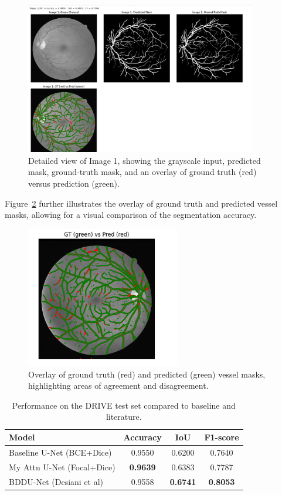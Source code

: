 \documentclass[11pt]{article}
\begin{document}
\begin{figure}[h!]
    \centering
    \includegraphics[width=0.9\textwidth]{figure_image_1_metrics_and_masks.png}
    \caption{Detailed view of Image 1, showing the grayscale input, predicted mask, ground-truth mask, and an overlay of ground truth (red) versus prediction (green).}
    \label{fig:image_1_metrics_and_masks}
\end{figure}

Figure~\ref{fig:gt_vs_pred_overlay} further illustrates the overlay of ground truth and predicted vessel masks, allowing for a visual comparison of the segmentation accuracy.

\begin{figure}[h!]
    \centering
    \includegraphics[width=0.6\textwidth]{figure_gt_vs_pred_overlay.png}
    \caption{Overlay of ground truth (red) and predicted (green) vessel masks, highlighting areas of agreement and disagreement.}
    \label{fig:gt_vs_pred_overlay}
\end{figure}


\begin{table}[h]
\centering
\caption{Performance on the DRIVE test set compared to baseline and literature.}
\begin{tabular}{lccc}
\hline
\textbf{Model} & \textbf{Accuracy} & \textbf{IoU} & \textbf{F1-score} \\
\hline
Baseline U-Net (BCE+Dice) & 0.9550 & 0.6200 & 0.7640 \\
My Attn U-Net (Focal+Dice) & \textbf{0.9639} & 0.6383 & 0.7787 \\
BDDU-Net (Desiani et al) & 0.9558 & \textbf{0.6741} & \textbf{0.8053} \\
\hline
\end{tabular}
\label{tab:drive_results}
\end{table}
\end{document}

